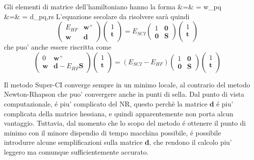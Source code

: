 Gli elementi di matrice dell'hamiltoniano hanno la forma
\beqas
{} &=&  = w_{pq} \\
 &=&  = d_{pq,rs}
\eeqas
L'equazione secolare da risolvere sar\`a quindi
$$
\left(
\begin{array}{cc}
E_{HF} & \mathbf{w}^+ \\
\mathbf{w} & \mathbf{d}
\end{array} \right)
\left(
\begin{array}{c}
1 \\
\mathbf{t} \\
\end{array}
\right)
= E_{SCI}
\left(
\begin{array}{cc}
1 & \mathbf{0} \\
\mathbf{0} & \mathbf{S}
\end{array}
\right)
\left(
\begin{array}{c}
1 \\
\mathbf{t} \\
\end{array}
\right)
$$
che puo' anche essere riscritta come
$$
\left(
\begin{array}{cc}
0 & \mathbf{w}^+ \\
\mathbf{w} & \mathbf{d}-E_{HF}\mathbf{S}
\end{array} \right)
\left(
\begin{array}{c}
1 \\
\mathbf{t} \\
\end{array}
\right)
= \left( E_{SCI} - E_{HF} \right)
\left(
\begin{array}{cc}
1 & \mathbf{0} \\
\mathbf{0} & \mathbf{S}
\end{array}
\right)
\left(
\begin{array}{c}
1 \\
\mathbf{t} \\
\end{array}
\right)
$$

Il metodo Super-CI converge sempre in un minimo locale, al contrario del
metodo Newton-Rhapson che puo' convergere anche in punti di sella.
Dal punto di vista computazionale, \'e piu' complicato del NR, questo
perch\`e la matrice $\mathbf{d}$ \'e piu' complicata della matrice
hessiana, e quindi apparentemente non porta alcun vantaggio. Tuttavia,
dal momento che lo scopo del metodo \'e ottenere il punto di minimo con
il minore dispendio di tempo macchina possibile, \'e possibile introdurre
alcune semplificazioni sulla matrice $\mathbf{d}$, che rendono il
calcolo piu' leggero ma comunque sufficientemente accurato.

